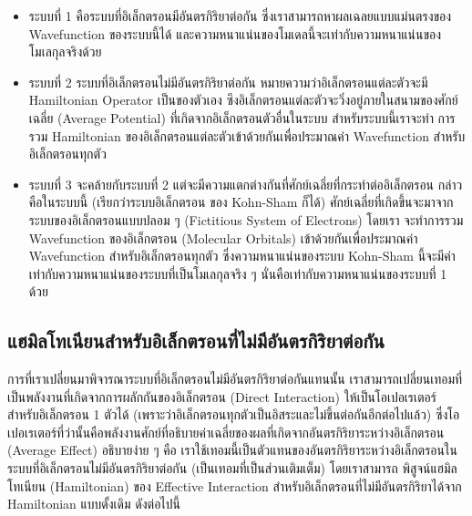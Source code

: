 \begin{itemize}[topsep=0pt,noitemsep]\setlength\itemsep{0.5em}
    \item ระบบที่ 1 คือระบบที่อิเล็กตรอนมีอันตรกิริยาต่อกัน ซึ่งเราสามารถหาผลเฉลยแบบแม่นตรงของ Wavefunction ของระบบนี้ได้
          และความหนาแน่นของโมเดลนี้จะเท่ากับความหนาแน่นของโมเลกุลจริงด้วย

    \item ระบบที่ 2 ระบบที่อิเล็กตรอนไม่มีอันตรกิริยาต่อกัน หมายความว่าอิเล็กตรอนแต่ละตัวจะมี Hamiltonian Operator เป็นของตัวเอง
          ซึงอิเล็กตรอนแต่ละตัวจะวิ่งอยู่ภายในสนามของศักย์เฉลี่ย (Average Potential) ที่เกิดจากอิเล็กตรอนตัวอื่นในระบบ สำหรับระบบนี้เราจะทำ%
          การรวม Hamiltonian ของอิเล็กตรอนแต่ละตัวเข้าด้วยกันเพื่อประมาณค่า Wavefunction สำหรับอิเล็กตรอนทุกตัว

    \item ระบบที่ 3 จะคล้ายกับระบบที่ 2 แต่จะมีความแตกต่างกันที่ศักย์เฉลี่ยที่กระทำต่ออิเล็กตรอน กล่าวคือในระบบนี้ (เรียกว่าระบบอิเล็กตรอน
          ของ Kohn-Sham ก็ได้) ศักย์เฉลี่ยที่เกิดขึ้นจะมาจากระบบของอิเล็กตรอนแบบปลอม ๆ (Fictitious System of Electrons) โดยเรา%
          จะทำการรวม Wavefunction ของอิเล็กตรอน (Molecular Orbitals) เข้าด้วยกันเพื่อประมาณค่า Wavefunction สำหรับอิเล็กตรอนทุกตัว
          ซึ่งความหนาแน่นของระบบ Kohn-Sham นี้จะมีค่าเท่ากับความหนาแน่นของระบบที่เป็นโมเลกุลจริง ๆ นั่นคือเท่ากับความหนาแน่นของระบบที่ 1
          ด้วย
\end{itemize}

\subsection{แฮมิลโทเนียนสำหรับอิเล็กตรอนที่ไม่มีอันตรกิริยาต่อกัน}
\label{ssec:hamil_noninter_elec}

การที่เราเปลี่ยนมาพิจารณาระบบที่อิเล็กตรอนไม่มีอันตรกิริยาต่อกันแทนนั้น เราสามารถเปลี่ยนเทอมที่เป็นพลังงานที่เกิดจากการผลักกันของอิเล็กตรอน
(Direct Interaction) ให้เป็นโอเปอเรเตอร์สำหรับอิเล็กตรอน 1 ตัวได้ (เพราะว่าอิเล็กตรอนทุกตัวเป็นอิสระและไม่ขึ้นต่อกันอีกต่อไปแล้ว)
ซึ่งโอเปอเรเตอร์ที่ว่านั้นคือพลังงานศักย์ที่อธิบายค่าเฉลี่ยของผลที่เกิดจากอันตรกิริยาระหว่างอิเล็กตรอน (Average Effect) อธิบายง่าย ๆ คือ%
เราใช้เทอมนี้เป็นตัวแทนของอันตรกิริยาระหว่างอิเล็กตรอนในระบบที่อิเล็กตรอนไม่มีอันตรกิริยาต่อกัน (เป็นเทอมที่เป็นส่วนเติมเต็ม) โดยเราสามารถ%
พิสูจน์แฮมิลโทเนียน (Hamiltonian) ของ Effective Interaction สำหรับอิเล็กตรอนที่ไม่มีอันตรกิริยาได้จาก Hamiltonian แบบดั้งเดิม
ดังต่อไปนี้

